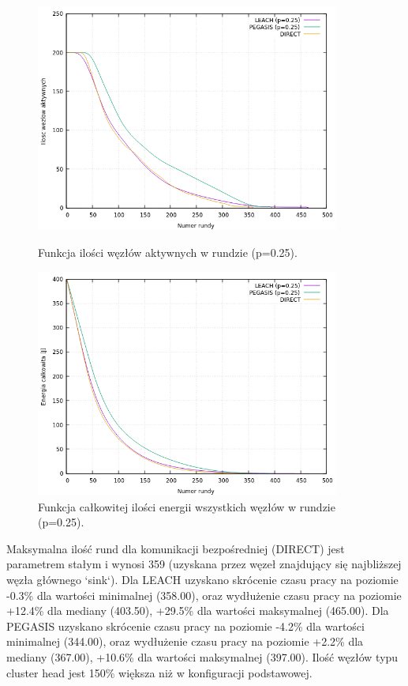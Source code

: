 \documentclass[a4paper,12pt,twoside,openany]{report}
\begin{document}
\begin{figure}[H]
 \centering
 \includegraphics[width=10cm]{images/gnuplot/test_4/nodes_in_round_p025.png}
 \caption{Funkcja ilości węzłów aktywnych w rundzie (p=0.25).}
 \includegraphics[width=10cm]{images/gnuplot/test_4/energy_in_round_p025.png}
 \caption{Funkcja całkowitej ilości energii wszystkich węzłów w rundzie (p=0.25).}
\end{figure}

\par
Maksymalna ilość rund dla komunikacji bezpośredniej (DIRECT) jest parametrem stałym i wynosi 359 (uzyskana przez węzeł znajdujący się najbliższej węzła głównego `sink`).
Dla LEACH uzyskano skrócenie czasu pracy na poziomie -0.3\% dla wartości minimalnej (358.00), oraz wydłużenie czasu pracy na poziomie +12.4\% dla mediany (403.50), +29.5\% dla wartości maksymalnej (465.00).
Dla PEGASIS uzyskano skrócenie czasu pracy na poziomie -4.2\% dla wartości minimalnej (344.00), oraz wydłużenie czasu pracy na poziomie +2.2\% dla mediany (367.00), +10.6\% dla wartości maksymalnej (397.00).
Ilość węzłów typu cluster head jest 150\% większa niż w konfiguracji podstawowej.
\end{document}
